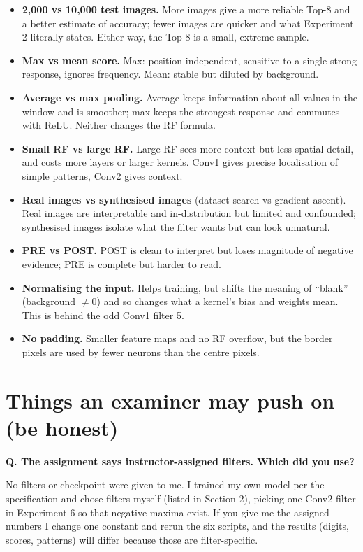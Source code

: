 \documentclass[11pt]{article}
\newcommand{\Q}[1]{\par\vspace{4pt}\noindent\textcolor{qcol}{\textbf{Q. #1}}\par\nopagebreak}
\newcommand{\A}[1]{\noindent #1\par}
\begin{document}
\begin{itemize}
\item \textbf{2,000 vs 10,000 test images.} More images give a more reliable Top-8 and a better estimate of accuracy; fewer images are quicker and what Experiment 2 literally states. Either way, the Top-8 is a small, extreme sample.
\item \textbf{Max vs mean score.} Max: position-independent, sensitive to a single strong response, ignores frequency. Mean: stable but diluted by background.
\item \textbf{Average vs max pooling.} Average keeps information about all values in the window and is smoother; max keeps the strongest response and commutes with ReLU. Neither changes the RF formula.
\item \textbf{Small RF vs large RF.} Large RF sees more context but less spatial detail, and costs more layers or larger kernels. Conv1 gives precise localisation of simple patterns, Conv2 gives context.
\item \textbf{Real images vs synthesised images} (dataset search vs gradient ascent). Real images are interpretable and in-distribution but limited and confounded; synthesised images isolate what the filter wants but can look unnatural.
\item \textbf{PRE vs POST.} POST is clean to interpret but loses magnitude of negative evidence; PRE is complete but harder to read.
\item \textbf{Normalising the input.} Helps training, but shifts the meaning of ``blank'' (background $\ne0$) and so changes what a kernel's bias and weights mean. This is behind the odd Conv1 filter 5.
\item \textbf{No padding.} Smaller feature maps and no RF overflow, but the border pixels are used by fewer neurons than the centre pixels.
\end{itemize}

\section{Things an examiner may push on (be honest)}

\Q{The assignment says instructor-assigned filters. Which did you use?}
\A{No filters or checkpoint were given to me. I trained my own model per the specification and chose filters myself (listed in Section 2), picking one Conv2 filter in Experiment 6 so that negative maxima exist. If you give me the assigned numbers I change one constant and rerun the six scripts, and the results (digits, scores, patterns) will differ because those are filter-specific.}
\end{document}
